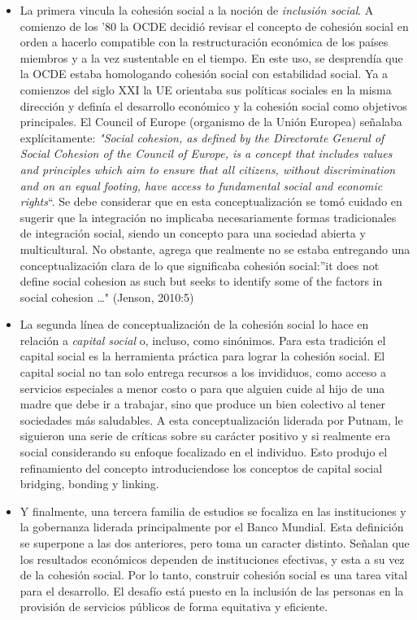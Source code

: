 \documentclass[
  12pt,
]{book}
\begin{document}
\begin{itemize}
\item
  La primera vincula la cohesión social a la noción de \emph{inclusión social}. A comienzo de los '80 la OCDE decidió revisar el concepto de cohesión social en orden a hacerlo compatible con la restructuración económica de los países miembros y a la vez sustentable en el tiempo. En este uso, se desprendía que la OCDE estaba homologando cohesión social con estabilidad social. Ya a comienzos del siglo XXI la UE orientaba sus políticas sociales en la misma dirección y definía el desarrollo económico y la cohesión social como objetivos principales. El Council of Europe (organismo de la Unión Europea) señalaba explícitamente: \emph{"Social cohesion, as defined by the Directorate General of Social Cohesion of the Council of Europe, is a concept that includes values and principles which aim to ensure that all citizens, without discrimination and on an equal footing, have access to fundamental social and economic rights}``. Se debe considerar que en esta conceptualización se tomó cuidado en sugerir que la integración no implicaba necesariamente formas tradicionales de integración social, siendo un concepto para una sociedad abierta y multicultural. No obstante, \citet{jenson2010defining} agrega que realmente no se estaba entregando una conceptualización clara de lo que significaba cohesión social:''it does not define social cohesion as such but seeks to identify some of the factors in social cohesion \ldots" (Jenson, 2010:5)
\item
  La segunda línea de conceptualización de la cohesión social lo hace en relación a \emph{capital social} o, incluso, como sinónimos. Para esta tradición el capital social es la herramienta práctica para lograr la cohesión social. El capital social no tan solo entrega recursos a los invididuos, como acceso a servicios especiales a menor costo o para que alguien cuide al hijo de una madre que debe ir a trabajar, sino que produce un bien colectivo al tener sociedades más saludables. A esta conceptualización liderada por Putnam, le siguieron una serie de críticas sobre su carácter positivo y si realmente era social considerando su enfoque focalizado en el individuo. Esto produjo el refinamiento del concepto introduciendose los conceptos de capital social bridging, bonding y linking.
\item
  Y finalmente, una tercera familia de estudios se focaliza en las instituciones y la gobernanza liderada principalmente por el Banco Mundial. Esta definición se superpone a las dos anteriores, pero toma un caracter distinto. Señalan que los resultados económicos dependen de instituciones efectivas, y esta a su vez de la cohesión social. Por lo tanto, construir cohesión social es una tarea vital para el desarrollo. El desafío está puesto en la inclusión de las personas en la provisión de servicios públicos de forma equitativa y eficiente.
\end{itemize}
\end{document}
